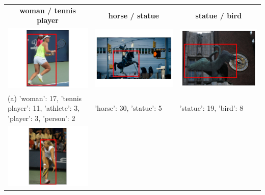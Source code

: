 \documentclass[11pt,a4paper]{article}
\begin{document}
\begin{table}[t]
	\begin{tabularx}{\textwidth}{XXX}
		\multicolumn{1}{c}{\textbf{woman / tennis player}} 
		& \multicolumn{1}{c}{\textbf{horse / statue}} 
		&\multicolumn{1}{c}{\textbf{statue / bird}} \\
		\includegraphics[width=0.6\columnwidth]{images/2384231_692300_singleton_obj.png}
		& \includegraphics[width=0.6\columnwidth]{images/2374110_2599202_singleton_obj.png}
		& \includegraphics[width=0.6\columnwidth]{images/2387975_676194_seed_ambiguous.png}
		\\
		(a) 'woman': 17, 'tennis player': 11, 'athlete': 3, 'player': 3, 'person': 2
		& 'horse': 30, 'statue': 5
		& 'statue': 19, 'bird': 8
		\\
		\includegraphics[width=0.6\columnwidth]{images/2321096_1048648_singleton_obj.png}

\end{tabularx}
\end{table}
\end{document}
